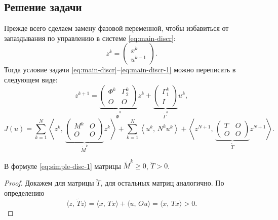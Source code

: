 \subsection{Решение задачи}

Прежде всего сделаем замену фазовой переменной, чтобы избавиться от запаздывания по управлению в системе \eqref{eq:main-discr}:
$$
        z^k = \begin{pmatrix}
x^k\\
u^{k-1}
        \end{pmatrix}.
$$
Тогда условие задачи \eqref{eq:main-discr}--\eqref{eq:main-discr-1} можно переписать в следующем виде:
\begin{equation}\label{eq:simple-disc}
        z^{k+1} = \underbrace{\begin{pmatrix}
\Phi^k & \Gamma_2^k\\
O & O
        \end{pmatrix}}_{\tilde \Phi^k}
        z^k + \underbrace{
        \begin{pmatrix}
\Gamma_1^k \\
I
        \end{pmatrix}
        }_{\tilde\Gamma^k} u^k,
\end{equation}
\begin{equation}\label{eq:simple-disc-1}
        J(u) = \sum\limits_{k = 1}^{N}
        \left
        \langle
z^k,\,
\underbrace{
\begin{pmatrix}
M^k & O \\
O & O
\end{pmatrix}}_{\tilde M^k}
z^k
        \right
        \rangle
        +
        \sum\limits_{k = 1}^{N}
        \left
        \langle
u^k,\,
N^k
u^k
        \right
        \rangle
        +
        \left
        \langle
z^{N+1},\,
\underbrace{
\begin{pmatrix}
T & O \\
O & O
\end{pmatrix}}_{\tilde T}
z^{N+1}
        \right
        \rangle.    
\end{equation}

\begin{assertion}
        В формуле \eqref{eq:simple-disc-1} матрицы $\tilde M^k \geqslant 0$, $\tilde T > 0$.
\end{assertion}

\begin{proof}
Докажем для матрицы $\tilde T$, для остальных матриц аналогично. По определению
$$
        \langle z,\, \tilde T z \rangle =
        \langle x,\, Tx \rangle + \langle u,\, Ou\rangle = 
        \langle x,\, Tx \rangle > 0.
$$
\end{proof}

